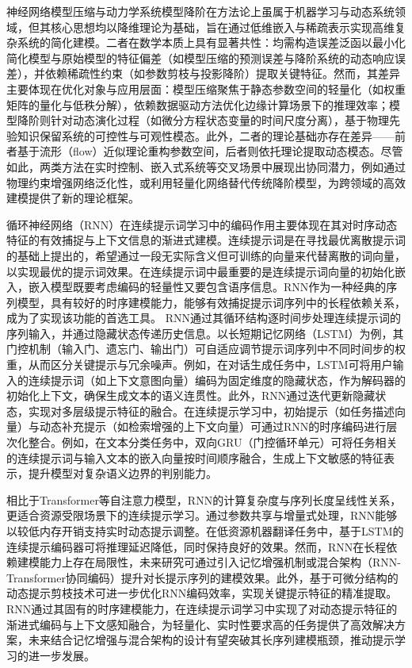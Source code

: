 神经网络模型压缩与动力学系统模型降阶在方法论上虽属于机器学习与动态系统领域，但其核心思想均以降维理论为基础，旨在通过低维嵌入与稀疏表示实现高维复杂系统的简化建模。二者在数学本质上具有显著共性：均需构造误差泛函以最小化简化模型与原始模型的特征偏差（如模型压缩的预测误差与降阶系统的动态响应误差），并依赖稀疏性约束（如参数剪枝与投影降阶）提取关键特征。然而，其差异主要体现在优化对象与应用层面：模型压缩聚焦于静态参数空间的轻量化（如权重矩阵的量化与低秩分解），依赖数据驱动方法优化边缘计算场景下的推理效率；模型降阶则针对动态演化过程（如微分方程状态变量的时间尺度分离），基于物理先验知识保留系统的可控性与可观性模态。此外，二者的理论基础亦存在差异——前者基于流形（flow）近似理论重构参数空间，后者则依托理论提取动态模态。尽管如此，两类方法在实时控制、嵌入式系统等交叉场景中展现出协同潜力，例如通过物理约束增强网络泛化性，或利用轻量化网络替代传统降阶模型，为跨领域的高效建模提供了新的理论框架。

循环神经网络（RNN）在连续提示词学习中的编码作用主要体现在其对时序动态特征的有效捕捉与上下文信息的渐进式建模。连续提示词\cite{liu2022p}是在寻找最优离散提示词的基础上提出的，希望通过一段无实际含义但可训练的向量来代替离散的词向量，以实现最优的提示词效果。在连续提示词中最重要的是连续提示词向量的初始化嵌入，嵌入模型既要考虑编码的轻量性又要包含语序信息。RNN作为一种经典的序列模型，具有较好的时序建模能力，能够有效捕捉提示词序列中的长程依赖关系，成为了实现该功能的首选工具。
RNN通过其循环结构逐时间步处理连续提示词的序列输入，并通过隐藏状态传递历史信息。以长短期记忆网络（LSTM）为例，其门控机制（输入门、遗忘门、输出门）可自适应调节提示词序列中不同时间步的权重，从而区分关键提示与冗余噪声。例如，在对话生成任务中，LSTM可将用户输入的连续提示词（如上下文意图向量）编码为固定维度的隐藏状态，作为解码器的初始化上下文，确保生成文本的语义连贯性。此外，RNN通过迭代更新隐藏状态，实现对多层级提示特征的融合。在连续提示学习中，初始提示（如任务描述向量）与动态补充提示（如检索增强的上下文向量）可通过RNN的时序编码进行层次化整合。例如，在文本分类任务中，双向GRU（门控循环单元）可将任务相关的连续提示词与输入文本的嵌入向量按时间顺序融合，生成上下文敏感的特征表示，提升模型对复杂语义边界的判别能力。

相比于Transformer等自注意力模型，RNN的计算复杂度与序列长度呈线性关系，更适合资源受限场景下的连续提示学习。通过参数共享与增量式处理，RNN能够以较低内存开销支持实时动态提示调整。在低资源机器翻译任务中，基于LSTM的连续提示编码器可将推理延迟降低，同时保持良好的效果。然而，RNN在长程依赖建模能力上存在局限性，未来研究可通过引入记忆增强机制或混合架构（RNN-Transformer协同编码）提升对长提示序列的建模效果。此外，基于可微分结构的动态提示剪枝技术可进一步优化RNN编码效率，实现关键提示特征的精准提取。RNN通过其固有的时序建模能力，在连续提示词学习中实现了对动态提示特征的渐进式编码与上下文感知融合，为轻量化、实时性要求高的任务提供了高效解决方案，未来结合记忆增强与混合架构的设计有望突破其长序列建模瓶颈，推动提示学习的进一步发展。
